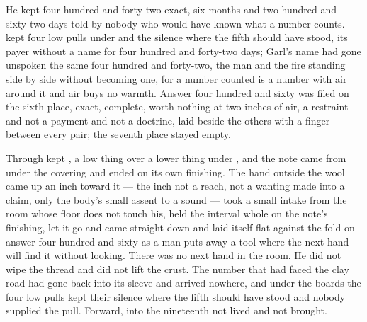 He kept four hundred and forty-two exact, six months and two hundred and sixty-two days told by nobody who would have known what a number counts.  kept four low pulls under  and the silence where the fifth should have stood, its payer without a name for four hundred and forty-two days; Garl's name had gone unspoken the same four hundred and forty-two, the man and the fire standing side by side without becoming one, for a number counted is a number with air around it and air buys no warmth. Answer four hundred and sixty was filed on the sixth place, exact, complete, worth nothing at two inches of air, a restraint and not a payment and not a doctrine, laid beside the others with a finger between every pair; the seventh place stayed empty.

Through   kept , a low thing over a lower thing under , and the note came from under the covering and ended on its own finishing. The hand outside the wool came up an inch toward it --- the inch not a reach, not a wanting made into a claim, only the body's small assent to a sound --- took a small intake from the room whose floor does not touch his, held the interval whole on the note's finishing, let it go and came straight down and laid itself flat against the fold on answer four hundred and sixty as a man puts away a tool where the next hand will find it without looking. There was no next hand in the room. He did not wipe the thread and did not lift the crust. The number that had faced the clay road had gone back into its sleeve and arrived nowhere, and under the boards the four low pulls kept their silence where the fifth should have stood and nobody supplied the pull. Forward, into the nineteenth not lived and not brought.
